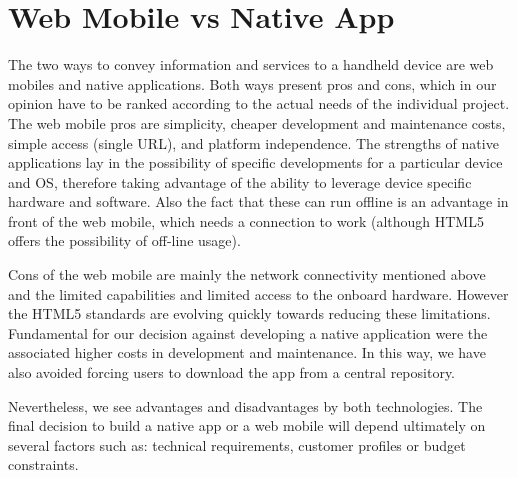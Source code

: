 \section{Web Mobile vs Native App}

The two ways to convey information and services to a handheld device are web mobiles and native applications. Both ways present pros and cons, which in our opinion have to be ranked according to the actual needs of the individual project. The web mobile pros are simplicity, cheaper development and maintenance costs, simple access (single URL), and platform independence. The strengths of native applications lay in the possibility of specific developments for a particular device and OS, therefore taking advantage of the ability to leverage device specific hardware and software. Also the fact that these can run offline is an advantage in front of the web mobile, which needs a connection to work (although HTML5 offers the possibility of off-line usage).

Cons of the web mobile are mainly the network connectivity mentioned above and the limited capabilities and limited access to the onboard hardware. However the HTML5 standards are evolving quickly towards reducing these limitations. Fundamental for our decision against developing a native application were the associated higher costs in development and maintenance. In this way, we have also avoided forcing users to download the app from a central repository.

Nevertheless, we see advantages and disadvantages by both technologies. The final decision to build a native app or a web mobile will depend ultimately on several factors such as: technical requirements, customer profiles or budget constraints.


